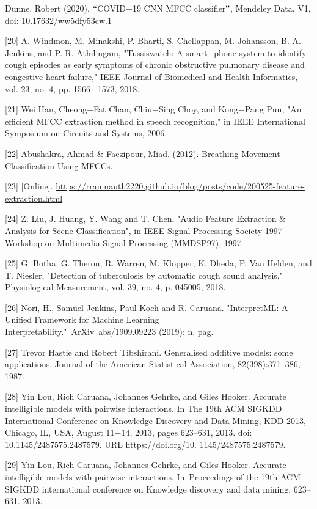 \documentclass[11pt]{article}
\begin{document}
\begin{itemize}
[19] Dunne, Robert (2020), $``$COVID$-$19 CNN MFCC classifier$"$, Mendeley Data, V1, doi: 10.17632/ww5dfy53cw.1

[20] A. Windmon, M. Minakshi, P. Bharti, S. Chellappan, M. Johansson, B. A. Jenkins, and P. R. Athilingam, "Tussiswatch: A smart$-$phone system to identify cough episodes as early symptoms of chronic obstructive pulmonary disease and congestive heart failure," IEEE Journal of Biomedical and Health Informatics, vol. 23, no. 4, pp. 1566– 1573, 2018. 

[21] Wei Han, Cheong$-$Fat Chan, Chiu$-$Sing Choy, and Kong$-$Pang Pun, "An efficient MFCC extraction method in speech recognition," in IEEE International Symposium on Circuits and Systems, 2006.

[22] Abushakra, Ahmad $\&$ Faezipour, Miad. (2012). Breathing Movement Classification Using MFCCs.

[23] [Online]. \url{https://rramnauth2220.github.io/blog/posts/code/200525-feature-extraction.html} 

[24] Z. Liu, J. Huang, Y. Wang and T. Chen, "Audio Feature Extraction $\&$ Analysis for Scene Classification", in IEEE Signal Processing Society 1997 Workshop on Multimedia Signal Processing (MMDSP97), 1997

[25] G. Botha, G. Theron, R. Warren, M. Klopper, K. Dheda, P. Van Helden, and T. Niesler, "Detection of tuberculosis by automatic cough sound analysis," Physiological Measurement, vol. 39, no. 4, p. 045005, 2018. 

[26] Nori, H., Samuel Jenkins, Paul Koch and R. Caruana. "InterpretML: A Unified Framework for Machine Learning Interpretability." ArXiv abs/1909.09223 (2019): n. pag.

[27] Trevor Hastie and Robert Tibshirani. Generalised additive models: some applications. Journal of the American Statistical Association, 82(398):371–386, 1987.

[28] Yin Lou, Rich Caruana, Johannes Gehrke, and Giles Hooker. Accurate intelligible models with pairwise interactions. In The 19th ACM SIGKDD International Conference on Knowledge Discovery and Data Mining, KDD 2013, Chicago, IL, USA, August 11$-$14, 2013, pages 623–631, 2013. doi: 10.1145/2487575.2487579. URL \href{https://doi.org/10.\%201145/2487575.2487579}{https://doi.org/10. 1145/2487575.2487579}.

[29] Yin Lou, Rich Caruana, Johannes Gehrke, and Giles Hooker. Accurate intelligible models with pairwise interactions. In Proceedings of the 19th ACM SIGKDD international conference on Knowledge discovery and data mining, 623–631. 2013.


\end{itemize}
\end{document}
